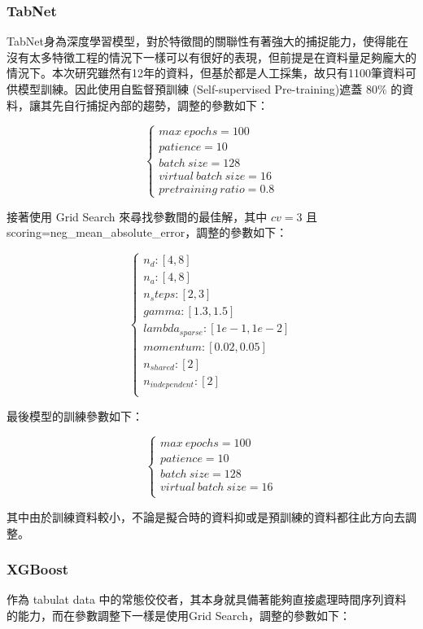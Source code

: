 \documentclass[12pt]{ctexart}
\begin{document}
\subsubsection{TabNet}
TabNet身為深度學習模型，對於特徵間的關聯性有著強大的捕捉能力，使得能在沒有太多特徵工程的情況下一樣可以有很好的表現，但前提是在資料量足夠龐大的情況下。本次研究雖然有12年的資料，但基於都是人工採集，故只有1100筆資料可供模型訓練。因此使用自監督預訓練 (Self-supervised Pre-training)遮蓋 $80\%$ 的資料，讓其先自行捕捉內部的趨勢，調整的參數如下：

\[
\begin{cases}
    max \ epochs=100 \\
    patience=10 \\
    batch \ size=128 \\
    virtual \ batch \ size=16 \\
    pretraining \ ratio=0.8
\end{cases}
\]

接著使用 Grid Search 來尋找參數間的最佳解，其中 $cv=3$ 且 scoring=neg\_mean\_absolute\_error，調整的參數如下：

\[
\begin{cases}
    n_d: [4, 8] \\
    n_a: [4, 8] \\
    n_steps: [2, 3] \\
    gamma: [1.3, 1.5] \\
    lambda_{sparse}: [1e-1, 1e-2] \\
    momentum: [0.02, 0.05] \\
    n_{shared}: [2] \\
    n_{independent}: [2] \\    
\end{cases}
\]

最後模型的訓練參數如下：

\[
\begin{cases}
    max \ epochs=100 \\
    patience=10 \\
    batch \ size=128 \\
    virtual \ batch \ size=16 \\
\end{cases}
\]

其中由於訓練資料較小，不論是擬合時的資料抑或是預訓練的資料都往此方向去調整。

\subsubsection{XGBoost}
作為 tabulat data 中的常態佼佼者，其本身就具備著能夠直接處理時間序列資料的能力，而在參數調整下一樣是使用Grid Search，調整的參數如下：
\end{document}

